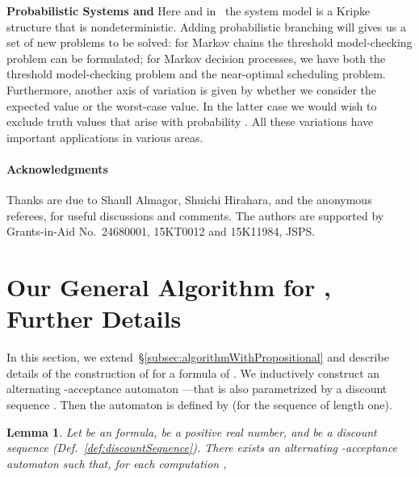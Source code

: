 \documentclass[a4paper,USenglish,numberwithinsect]{lipics}
\theoremstyle{definition}
\theoremstyle{remark}
\theoremstyle{plain}
\newtheorem{lem}[defi]{Lemma}
\begin{document}
\noindent
\textbf{Probabilistic Systems and } 
Here and in~\cite{AlmagorBK14} the system model is a Kripke structure
that is nondeterministic. Adding probabilistic branching will gives us 
a set of new problems to be solved: for Markov chains
the threshold
model-checking problem can be formulated; for Markov decision processes, 
we have both the threshold
model-checking problem and the near-optimal scheduling problem.
Furthermore, another axis of variation is given by
whether we consider the expected value or the worst-case value. In the
latter case we would wish to exclude truth values that arise
with probability .
 All these variations have important
applications in various areas.













\paragraph*{Acknowledgments}
Thanks are due to
Shaull Almagor,
  Shuichi Hirahara, and
the anonymous referees,
 for useful discussions and comments.
The authors are supported by
   Grants-in-Aid No.\
24680001, 15KT0012 and 15K11984, JSPS.


  






\newpage
\appendix






\section{Our General Algorithm for , Further Details}
\label{appendix:generalAlgorithmDetails}
In this section, we extend~\S{}\ref{subsec:algorithmWithPropositional}
and describe details of the construction of 
for a formula  of . 
We inductively construct an alternating -acceptance automaton 
---that is also parametrized by 
a discount sequence . Then the automaton 
  is defined by 
 (for the sequence
 of length one).
\begin{lem}\label{lem:correctnessWithPropositional}
  Let  be an  formula,  be a
 positive real number, and  be a discount sequence (Def.~\ref{def:discountSequence}). There exists an
alternating
-acceptance automaton  such that,
for each computation , 
  
\end{lem}
\end{document}
